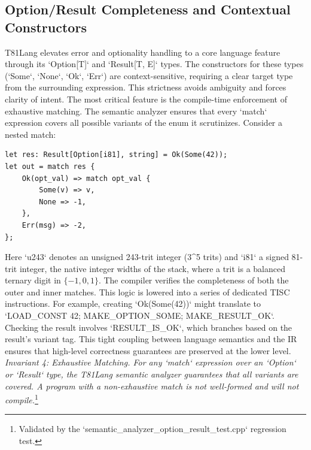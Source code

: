 \documentclass[sigconf, 10pt]{acmart}
\begin{document}
\subsection{Option/Result Completeness and Contextual Constructors}
T81Lang elevates error and optionality handling to a core language feature through its `Option[T]` and `Result[T, E]` types. The constructors for these types (`Some`, `None`, `Ok`, `Err`) are context-sensitive, requiring a clear target type from the surrounding expression. This strictness avoids ambiguity and forces clarity of intent.
The most critical feature is the compile-time enforcement of exhaustive matching. The semantic analyzer ensures that every `match` expression covers all possible variants of the enum it scrutinizes. Consider a nested match:
\begin{verbatim}
let res: Result[Option[i81], string] = Ok(Some(42));
let out = match res {
    Ok(opt_val) => match opt_val {
        Some(v) => v,
        None => -1,
    },
    Err(msg) => -2,
};
\end{verbatim}
Here `u243` denotes an unsigned 243-trit integer (3^5 trits) and `i81` a signed 81-trit integer, the native integer widths of the stack, where a trit is a balanced ternary digit in $\{-1,0,1\}$. The compiler verifies the completeness of both the outer and inner matches. This logic is lowered into a series of dedicated TISC instructions. For example, creating `Ok(Some(42))` might translate to `LOAD_CONST 42; MAKE_OPTION_SOME; MAKE_RESULT_OK`. Checking the result involves `RESULT_IS_OK`, which branches based on the result's variant tag. This tight coupling between language semantics and the IR ensures that high-level correctness guarantees are preserved at the lower level.
\textit{Invariant 4: Exhaustive Matching. For any `match` expression over an `Option` or `Result` type, the T81Lang semantic analyzer guarantees that all variants are covered. A program with a non-exhaustive match is not well-formed and will not compile.}\footnote{Validated by the `semantic_analyzer_option_result_test.cpp` regression test.}
\end{document}
